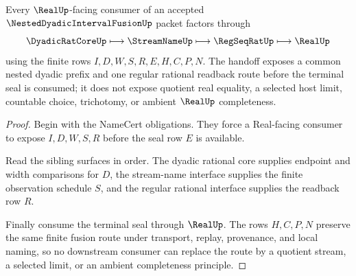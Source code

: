 \begin{theorem}
\label{thm:nested-dyadic-interval-fusion-real-handoff}
Every $\RealUp$-facing consumer of an accepted $\NestedDyadicIntervalFusionUp$ packet factors through
$$
\DyadicRatCoreUp \longmapsto \StreamNameUp \longmapsto \RegSeqRatUp \longmapsto \RealUp
$$
using the finite rows $I,D,W,S,R,E,H,C,P,N$. The handoff exposes a common nested dyadic prefix and one regular rational readback route before the terminal seal is consumed; it does not expose quotient real equality, a selected host limit, countable choice, trichotomy, or ambient $\RealUp$ completeness.
\end{theorem}
\begin{proof}
Begin with the NameCert obligations. They force a Real-facing consumer to expose $I,D,W,S,R$ before the seal row $E$ is available.

Read the sibling surfaces in order. The dyadic rational core supplies endpoint and width comparisons for $D$, the stream-name interface supplies the finite observation schedule $S$, and the regular rational interface supplies the readback row $R$.

Finally consume the terminal seal through $\RealUp$. The rows $H,C,P,N$ preserve the same finite fusion route under transport, replay, provenance, and local naming, so no downstream consumer can replace the route by a quotient stream, a selected limit, or an ambient completeness principle.
\end{proof}




